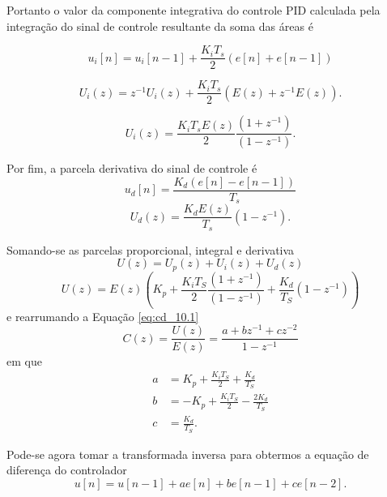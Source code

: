 Portanto o valor da componente integrativa do controle PID calculada pela integração do sinal de controle resultante da soma das áreas é

\begin{equation}
    \label{eq:cd_8}
    u_i[n] = u_i[n-1] + \frac{K_iT_s}{2} (e[n]+e[n-1])
\end{equation}


\begin{equation}
    \label{eq:cd_8.1}
    U_i(z) = z^{-1}U_i(z) + \frac{K_iT_s}{2} (E(z)+z^{-1}E(z)).
\end{equation}

\begin{equation}
    \label{eq:cd_8.2}
    U_i(z) =\frac{K_iT_sE(z)}{2} \frac{(1+z^{-1})}{(1-z^{-1})}.
\end{equation}

Por fim, a parcela derivativa do sinal de controle é
\begin{equation}
    \label{eq:cd_9}
    u_d[n] = \frac{K_d(e[n]-e[n-1])}{T_s}
\end{equation}
\begin{equation}
    \label{eq:cd_9.1}
    U_d(z) = \frac{K_dE(z)}{T_s} (1-z^{-1}).
\end{equation}

Somando-se as parcelas proporcional, integral e derivativa
\begin{equation}
    \label{eq:cd_10}
    U(z) = U_p(z) + U_i(z) + U_d(z)
\end{equation}
\begin{equation}
    \label{eq:cd_10.1}
    U(z) = E(z)\left(K_p+\frac{K_iT_S}{2} \frac{(1+z^{-1})}{(1-z^{-1})} + \frac{K_d}{T_S}(1-z^{-1})\right)
\end{equation}
e rearrumando a Equação \eqref{eq:cd_10.1}
\begin{equation}
    \label{eq:cd_11}
    C(z) = \frac{U(z)}{E(z)} = \frac{a+bz^{-1}+cz^{-2}}{1-z^{-1}}
\end{equation}
em que
\begin{align}
  a &= K_p + \frac{K_iT_S}{2} + \frac{K_d}{T_S} \nonumber\\
  b &= -K_p + \frac{K_iT_S}{2} - \frac{2K_d}{T_S} \nonumber\\
  c &= \frac{K_d}{T_S}. \nonumber
\end{align}

Pode-se agora tomar a transformada inversa para obtermos a equação de diferença do controlador
\begin{equation}
    \label{eq:cd_12}
    u[n] = u[n-1] + ae[n] + be[n-1]+ce[n-2].
\end{equation}

